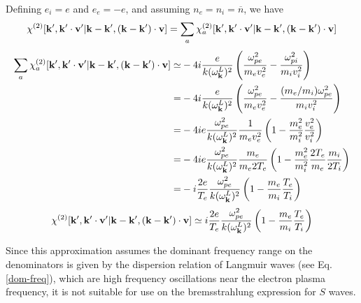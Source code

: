 \documentclass[12pt,a4paper,ruledheader]{report}
\begin{document}
\begin{appendix}
Defining $e_i=e$ and $e_e=-e$, and assuming $n_e=n_i=\overline{n}$, we have
\begin{equation}
\chi^{(2)}[{\bf k'},{\bf k'\cdot v'}|{\bf k-k'},({\bf k-k'})\cdot{\bf v}]
= \sum_a
\chi_a^{(2)}[{\bf k'},{\bf k'\cdot v'}|{\bf k-k'},({\bf k-k'})\cdot{\bf v}]
\end{equation}
\begin{equation}
\begin{split}
\sum_a
\chi_a^{(2)}[{\bf k'},{\bf k'\cdot v'}|{\bf k-k'},({\bf k-k'})\cdot{\bf v}]
\simeq & -4i\frac{e}{k(\omega_{\bf k}^L)^2}
\left(\frac{\omega_{pe}^2}{m_ev_e^2}-\frac{\omega_{pi}^2}{m_iv_i^2}\right)\\
=& -4i\frac{e}{k(\omega_{\bf k}^L)^2}
\left(\frac{\omega_{pe}^2}{m_ev_e^2}-\frac{(m_e/m_i)\omega_{pe}^2}{m_iv_i^2}\right)\\
=& -4ie\frac{\omega_{pe}^2}{k(\omega_{\bf k}^L)^2}\frac{1}{m_ev_e^2}
\left(1-\frac{m_e^2}{m_i^2}\frac{v_e^2}{v_i^2}\right)\\
=& -4ie\frac{\omega_{pe}^2}{k(\omega_{\bf k}^L)^2}\frac{m_e}{m_e2T_e}
\left(1-\frac{m_e^2}{m_i^2}\frac{2T_e}{m_e}\frac{m_i}{2T_i}\right)\\
=&-i\frac{2e}{T_e}\frac{\omega_{pe}^2}{k(\omega_{\bf k}^L)^2}
\left(1-\frac{m_e}{m_i}\frac{T_e}{T_i}\right)
\end{split}
\end{equation}
\begin{equation}
\label{chi2,4}
\chi^{(2)}[{\bf k'},{\bf k'\cdot v'}|{\bf k-k'},({\bf k-k'})\cdot{\bf v}]
\simeq i\frac{2e}{T_e}\frac{\omega_{pe}^2}{k(\omega_{\bf k}^L)^2}
\left(1-\frac{m_e}{m_i}\frac{T_e}{T_i}\right)
\end{equation}

Since this approximation assumes the dominant frequency range on the
denominators is given by the dispersion relation of Langmuir waves
(see Eq. \eqref{dom-freq}), which are high frequency oscillations
near the electron plasma frequency, it is not suitable for use on
the bremsstrahlung expression for $S$ waves.



\end{appendix}
\end{document}

